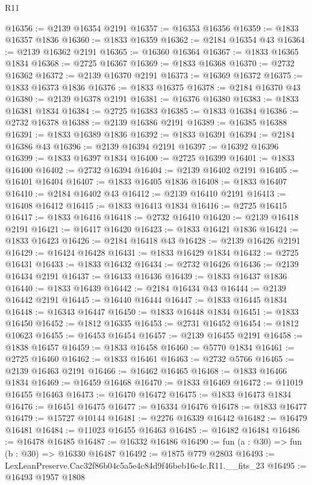 \begin{lexlean}{R11}
\begin{coremodule}
@16356 := @2139 @16354 @2191
@16357 := @16353 @16356
@16359 := @1833 @16357 @1836
@16360 := @1833 @16359
@16362 := @2184 @16354 @43
@16364 := @2139 @16362 @2191
@16365 := @16360 @16364
@16367 := @1833 @16365 @1834
@16368 := @2725 @16367
@16369 := @1833 @16368
@16370 := @2732 @16362
@16372 := @2139 @16370 @2191
@16373 := @16369 @16372
@16375 := @1833 @16373 @1836
@16376 := @1833 @16375
@16378 := @2184 @16370 @43
@16380 := @2139 @16378 @2191
@16381 := @16376 @16380
@16383 := @1833 @16381 @1834
@16384 := @2725 @16383
@16385 := @1833 @16384
@16386 := @2732 @16378
@16388 := @2139 @16386 @2191
@16389 := @16385 @16388
@16391 := @1833 @16389 @1836
@16392 := @1833 @16391
@16394 := @2184 @16386 @43
@16396 := @2139 @16394 @2191
@16397 := @16392 @16396
@16399 := @1833 @16397 @1834
@16400 := @2725 @16399
@16401 := @1833 @16400
@16402 := @2732 @16394
@16404 := @2139 @16402 @2191
@16405 := @16401 @16404
@16407 := @1833 @16405 @1836
@16408 := @1833 @16407
@16410 := @2184 @16402 @43
@16412 := @2139 @16410 @2191
@16413 := @16408 @16412
@16415 := @1833 @16413 @1834
@16416 := @2725 @16415
@16417 := @1833 @16416
@16418 := @2732 @16410
@16420 := @2139 @16418 @2191
@16421 := @16417 @16420
@16423 := @1833 @16421 @1836
@16424 := @1833 @16423
@16426 := @2184 @16418 @43
@16428 := @2139 @16426 @2191
@16429 := @16424 @16428
@16431 := @1833 @16429 @1834
@16432 := @2725 @16431
@16433 := @1833 @16432
@16434 := @2732 @16426
@16436 := @2139 @16434 @2191
@16437 := @16433 @16436
@16439 := @1833 @16437 @1836
@16440 := @1833 @16439
@16442 := @2184 @16434 @43
@16444 := @2139 @16442 @2191
@16445 := @16440 @16444
@16447 := @1833 @16445 @1834
@16448 := @16343 @16447
@16450 := @1833 @16448 @1834
@16451 := @1833 @16450
@16452 := @1812 @16335
@16453 := @2731 @16452
@16454 := @1812 @10623
@16455 := @16453 @16454
@16457 := @2139 @16455 @2191
@16458 := @1838 @16457
@16459 := @1833 @16458
@16460 := @5770 @1834
@16461 := @2725 @16460
@16462 := @1833 @16461
@16463 := @2732 @5766
@16465 := @2139 @16463 @2191
@16466 := @16462 @16465
@16468 := @1833 @16466 @1834
@16469 := @16459 @16468
@16470 := @1833 @16469
@16472 := @11019 @16455 @16463
@16473 := @16470 @16472
@16475 := @1833 @16473 @1834
@16476 := @16451 @16475
@16477 := @16334 @16476
@16478 := @1833 @16477
@16479 := @15727 @10144
@16481 := @2276 @16339 @16442
@16482 := @16479 @16481
@16484 := @11023 @16455 @16463
@16485 := @16482 @16484
@16486 := @16478 @16485
@16487 := @16332 @16486
@16490 := fun (a : @30) => fun (b : @30) => @16330 @16487
@16492 := @1875 @779 @2803
@16493 := LexLeanPreserve.Cac32f86b04c5a5e4c84d9f46beb16e4c.R11.__fits_23
@16495 := @16493 @1957 @1808

\end{coremodule}
\end{lexlean}
